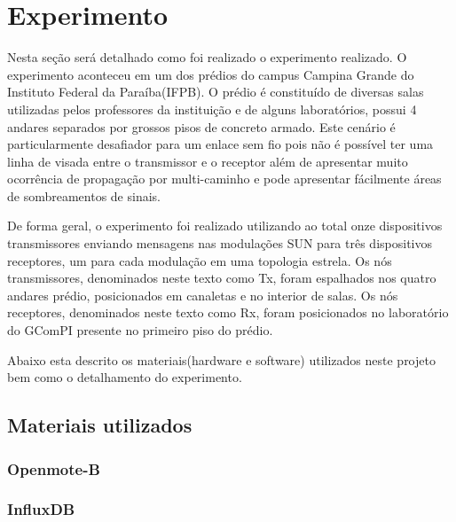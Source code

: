 \chapter{Experimento}
\label{experimento}
Nesta seção será detalhado como foi realizado o experimento realizado. O experimento aconteceu em um dos prédios do campus Campina Grande do Instituto Federal da Paraíba(IFPB). O prédio é constituído de diversas salas utilizadas pelos professores da instituição e de alguns laboratórios, possui 4 andares separados por grossos pisos de concreto armado. Este cenário é particularmente desafiador para um enlace sem fio pois não é possível ter uma linha de visada entre o transmissor e o receptor além de apresentar muito ocorrência de propagação por multi-caminho e pode apresentar fácilmente áreas de sombreamentos de sinais.



De forma geral, o experimento foi realizado utilizando ao total onze dispositivos transmissores enviando mensagens nas modulações SUN para três dispositivos receptores, um para cada modulação em uma topologia estrela. Os nós transmissores, denominados neste texto como Tx, foram espalhados nos quatro andares prédio, posicionados em canaletas e no interior de salas. Os nós receptores, denominados neste texto como Rx, foram posicionados no laboratório do GComPI presente no primeiro piso do prédio.

Abaixo esta descrito os materiais(hardware e software) utilizados neste projeto bem como o detalhamento do experimento.

\section{Materiais utilizados}
\subsection*{Openmote-B}
\subsection*{InfluxDB}

